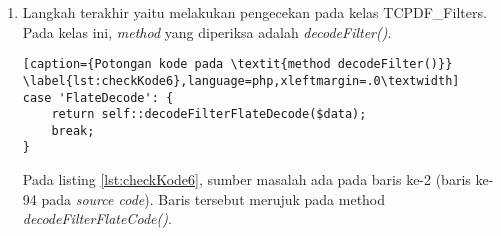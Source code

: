 \begin{enumerate}
	Pada listing \ref{lst:checkKode3}, sumber masalah berada pada baris ke-5 (baris ke-123 pada \textit{source code}). Baris tersebut merujuk pada method \textit{getIndirectObject()} yang ada pada kelas yang sama.
	
\begin{lstlisting}[caption={Potongan kode pada \textit{method getIndirectObject()}}	\label{lst:checkKode4},language=php,xleftmargin=.0\textwidth]
if ($decoding AND ($element[0] == 'stream') AND (isset($objdata[($i - 1)][0])) AND ($objdata[($i - 1)][0] == '<<')) {
	echo "start";	
	$element[3] = $this->decodeStream($objdata[($i - 1)][1], $element[1]);
	echo "stop";
}
\end{lstlisting}

	Pada listing \ref{lst:checkKode4}, sumber masalah berada pada baris ke-4 (baris ke-702 pada \textit{source code}). Baris tersebut merujuk pada \textit{method decodeStream()} yang ada pada kelas yang sama.
	
\begin{lstlisting}[caption={Potongan kode pada \textit{method decodeStream()}}	\label{lst:checkKode5},language=php,xleftmargin=.0\textwidth]
try {
	echo "start";
	$stream = TCPDF_FILTERS::decodeFilter($filter, $stream);
	echo "stop";
} catch (Exception $e) {
	$emsg = $e->getMessage();
	if ((($emsg[0] == '~') AND !$this >cfg['ignore_missing_filter_decoders']) OR (($emsg[0] != '~') AND !$this->cfg['ignore_filter_decoding_errors'])) {
		$this->Error($e->getMessage());
	}
}
\end{lstlisting}
	
	Pada listing \ref{lst:checkKode5}, sumber masalah berada pada baris ke-3 (baris ke-781 pada \textit{source code}). Baris tersebut merujuk pada kelas TCPDF\_Filters.
	
	\item Langkah terakhir yaitu melakukan pengecekan pada kelas TCPDF\_Filters. Pada kelas ini, \textit{method} yang diperiksa adalah \textit{decodeFilter()}.
	
\begin{lstlisting}[caption={Potongan kode pada \textit{method decodeFilter()}}	\label{lst:checkKode6},language=php,xleftmargin=.0\textwidth]
case 'FlateDecode': {
	return self::decodeFilterFlateDecode($data);
	break;
}
\end{lstlisting}
	
	Pada listing \ref{lst:checkKode6}, sumber masalah ada pada baris ke-2 (baris ke-94 pada \textit{source code}). Baris tersebut merujuk pada method \textit{decodeFilterFlateCode()}.
	

\end{enumerate}
